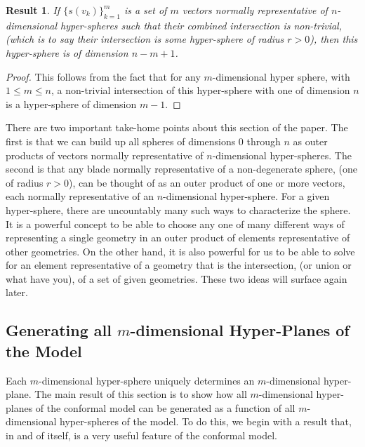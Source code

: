 \documentclass{article}
\newtheorem{result}{Result}[section]
\begin{document}
\begin{result}\label{rslt_sphere_is_outer_prod_of_spheres}
If $\{s(v_k)\}_{k=1}^m$ is a set of $m$ vectors normally representative
of $n$-dimensional hyper-spheres such that their combined
intersection is non-trivial, (which is to say their intersection is some hyper-sphere of radius $r>0$),
then this hyper-sphere is of dimension $n-m+1$.
\end{result}
\begin{proof}
This follows from the fact that for any $m$-dimensional hyper sphere, with $1\leq m\leq n$,
a non-trivial intersection of this hyper-sphere with one of dimension $n$ is a hyper-sphere of
dimension $m-1$.
\end{proof}

There are two important take-home points about this section of the paper.
The first is that we can build up all spheres of dimensions 0 through $n$ as outer
products of vectors normally representative of $n$-dimensional hyper-spheres.
The second is that any blade normally representative of a non-degenerate sphere, (one of radius $r>0$),
can be thought of as an outer product of one or more vectors, each normally representative
of an $n$-dimensional hyper-sphere.  For a given hyper-sphere, there are uncountably many
such ways to characterize the sphere.  It is a powerful concept to be
able to choose any one of many different ways of representing a single geometry in an outer product
of elements representative of other geometries.
On the other hand, it is also powerful for us to be able to solve for an element
representative of a geometry that is the intersection, (or union
or what have you), of a set of given geometries.  These two ideas will surface again later.

\subsection{Generating all $m$-dimensional Hyper-Planes of the Model}\label{sec_gen_all_planes}

Each $m$-dimensional hyper-sphere uniquely determines an $m$-dimensional hyper-plane.
The main result of this section is to show how all $m$-dimensional hyper-planes
of the conformal model can be generated as a function of all $m$-dimensional hyper-spheres
of the model.  To do this, we begin with a result that,
in and of itself, is a very useful feature of the conformal model.
\end{document}
